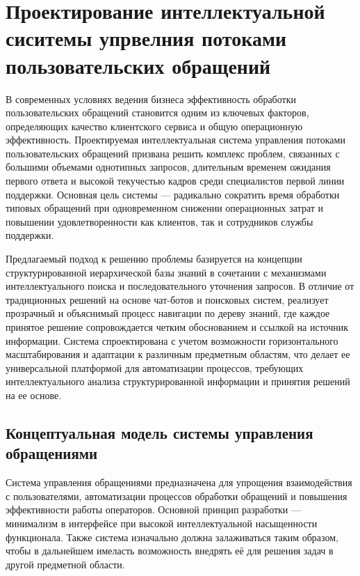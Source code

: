 \section{Проектирование интеллектуальной сиситемы упрвелния потоками пользовательских обращений}
\label{sec:designing}

В современных условиях ведения бизнеса эффективность обработки пользовательских обращений становится одним из ключевых факторов, определяющих качество клиентского сервиса и общую операционную эффективность. Проектируемая интеллектуальная система управления потоками пользовательских обращений призвана решить комплекс проблем, связанных с большими объемами однотипных запросов, длительным временем ожидания первого ответа и высокой текучестью кадров среди специалистов первой линии поддержки. Основная цель системы — радикально сократить время обработки типовых обращений при одновременном снижении операционных затрат и повышении удовлетворенности как клиентов, так и сотрудников службы поддержки.

Предлагаемый подход к решению проблемы базируется на концепции структурированной иерархической базы знаний в сочетании с механизмами интеллектуального поиска и последовательного уточнения запросов. В отличие от традиционных решений на основе чат-ботов и поисковых систем, реализует прозрачный и объяснимый процесс навигации по дереву знаний, где каждое принятое решение сопровождается четким обоснованием и ссылкой на источник информации. Система спроектирована с учетом возможности горизонтального масштабирования и адаптации к различным предметным областям, что делает ее универсальной платформой для автоматизации процессов, требующих интеллектуального анализа структурированной информации и принятия решений на ее основе.

\subsection{Концептуальная модель системы управления обращениями}

Система управления обращениями предназначена для упрощения взаимодействия с пользователями, автоматизации процессов обработки обращений и повышения эффективности работы операторов. Основной принцип разработки — минимализм в интерфейсе при высокой интеллектуальной насыщенности функционала. Также система изначально должна залаживаться таким образом, чтобы в дальнейшем имеласть возможность внедрять её для решения задач в другой предметной области.



